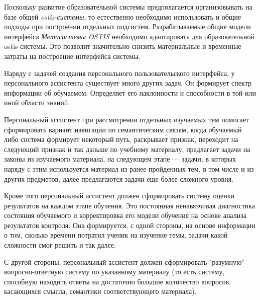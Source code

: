 Поскольку развитие образовательной системы предполагается организовывать на базе общей \textit{ostis-системы}, то естественно необходимо использовать и общие подходы при построении отдельных подсистем. Разрабатываемые общие модели интерфейса \textit{Метасистемы OSTIS} необходимо адаптировать для образовательной ostis-системы. Это позволит значительно снизить материальные и временные затраты на построение интерфейса системы.

Наряду с задачей создания персонального пользовательского интерфейса, у персонального ассистента существует много других задач. Он формирует спектр информации об обучаемом. Определяет его наклонности и способности в той или иной области знаний.

Персональный ассистент при рассмотрении отдельных изучаемых тем помогает сформировать вариант навигации по семантическим связям, когда обучаемый либо система формирует некоторый путь, раскрывает признак, переходит на следующий признак и так дальше по учебному материалу, предлагает задачи на законы из изучаемого материала, на следующем этапе --- задачи, в которых наряду с этим используется материал из ранее пройденных тем, в том числе и из других предметов, далее предлагаются задачи еще более сложного уровня. 

Кроме того персональный ассистент должен сформировать систему оценки результатов на каждом этапе обучения. Это постоянная ненавязчивая диагностика состояния обучаемого и корректировка его модели обучения на основе анализа результатов контроля. Она формируется, с одной стороны, на основе информации о том, сколько времени потратил ученик на изучение темы, задачи какой сложности смог решить и так далее.

С другой стороны, персональный ассистент должен сформировать "разумную"{} вопросно-ответную систему по указанному материалу (то есть систему, способную находить ответы на достаточно большое количество вопросов, касающихся смысла, семантики соответствующего материала).

